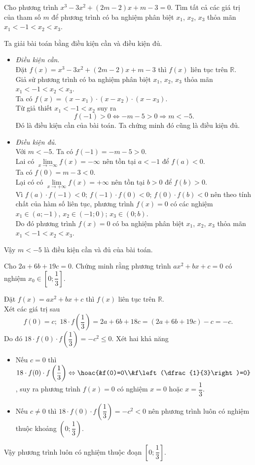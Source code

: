 \begin{bt}%
	Cho phương trình $x^3-3x^2+\left(2m-2\right)x+m-3=0$. Tìm tất cả các giá trị của tham số $m$ để phương trình có ba nghiệm phân biệt $x_1$, $x_2$, $x_3$ thỏa mãn $x_1<-1<x_2<x_3$.
	\loigiai
	{ Ta giải bài toán bằng điều kiện cần và điều kiện đủ.
		\begin{itemize}
			\item[•] \textit{Điều kiện cần}.\\
			Đặt $f(x)=x^3-3x^2+\left(2m-2\right)x+m-3$ thì $f(x)$ liên tục trên $\mathbb{R}$.\\
			Giả sử phương trình có ba nghiệm phân biệt $x_1$, $x_2$, $x_3$ thỏa mãn $x_1<-1<x_2<x_3$. \\
			Ta có $f(x)=(x-x_1)\cdot (x-x_2)\cdot (x-x_3)$.\\
			Từ giả thiết $x_1<-1<x_2$ suy ra 
			\[f(-1)>0\Leftrightarrow -m-5>0\Rightarrow m<-5.\]
			Đó là điều kiện cần của bài toán. Ta chứng minh đó cũng là điều kiện đủ.
			\item[•] \textit{Điều kiện đủ}.\\
			Với $m<-5$. Ta có $f(-1)=-m-5>0$.\\
			Lai có $\lim \limits _{x\to -\infty}f(x)=-\infty$ nên tồn tại $a<-1$ để $f(a)<0$.\\
			Ta có $f(0)=m-3<0$. \\
			Lại có có $\lim \limits _{x\to +\infty}f(x)=+\infty$ nên tồn tại $b>0$ để $f(b)>0$.\\
			Vì $f(a)\cdot f(-1)<0$; $f(-1)\cdot f(0)<0$; $f(0)\cdot f(b)<0$ nên theo tính chất của hàm số liên tục, phương trình $f(x)=0$ có các nghiệm $x_1\in (a;-1)$, $x_2\in (-1;0)$; $x_3\in (0;b)$.\\
			Do đó phương trình $f(x)=0$ có ba nghiệm phân biệt $x_1$, $x_2$, $x_3$ thỏa mãn $x_1<-1<x_2<x_3$.
		\end{itemize}
		Vậy $m<-5$ là điều kiện cần và đủ của bài toán.
	}
\end{bt}
\begin{bt}%
	Cho $2a+6b+19c=0$. Chứng minh rằng phương trình $ax^2+bx+c=0$ có nghiệm $ x_0\in \left[0;\dfrac{1}{3}\right]$.
	\loigiai
	{ Đặt $f(x)=ax^2+bx+c$ thì $f(x)$ liên tục trên $\mathbb{R}$.\\
		Xét các giá trị sau $$f(0)=c;\,\,18\cdot f\left(\dfrac{1}{3}\right)=2a+6b+18c=(2a+6b+19c)-c=-c.$$
		Do đó $18\cdot f(0)\cdot f\left(\dfrac{1}{3}\right)=-c^2\le 0$. Xét hai khả năng
		\begin{itemize}
			\item[•] Nếu $c=0$ thì $18\cdot f(0)\cdot f\left(\dfrac{1}{3}\right)\Leftrightarrow \hoac{&f(0)=0\\&f\left(\dfrac{1}{3}\right)=0}$, suy ra phương trình $f(x)=0$ có nghiệm $x=0$ hoặc $x=\dfrac{1}{3}$.
			\item[•] Nếu $c\ne 0$ thì $18\cdot f(0)\cdot f\left(\dfrac{1}{3}\right)=-c^2<0$ nên phương trình luôn có nghiệm thuộc khoảng $\left(0;\dfrac{1}{3}\right)$.
		\end{itemize} 
		Vậy phương trình luôn có nghiệm thuộc đoạn $\left[0;\dfrac{1}{3}\right]$.
	}
\end{bt}
